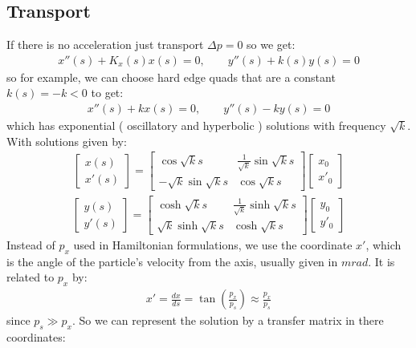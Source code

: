 \documentclass{article}
\numberwithin{equation}{section}
\begin{document}
\subsection{ Transport }
If there is no acceleration just transport $\Delta p = 0$ so we get:
\begin{align}
x''(s) + K_x(s) x(s) = 0 , \qquad
y''(s) + k(s) y(s) = 0
\end{align}
so for example, we can choose hard edge quads that are a constant $k(s) = -k < 0$ to get: 
\begin{align}
x''(s) + k x(s) = 0 , \qquad
y''(s) - k y(s) = 0
\end{align}
which has exponential ( oscillatory and hyperbolic ) solutions with frequency $\sqrt{k}$. With solutions given by:
\begin{align}
\begin{bmatrix} x(s) \\ x'(s) \end{bmatrix} =
\begin{bmatrix} \cos \sqrt{k}s & \frac{1}{\sqrt{k}} \sin \sqrt{k}s \\
-\sqrt{k} \sin \sqrt{k}s & \cos \sqrt{k}s \end{bmatrix}
\begin{bmatrix} x_0 \\ x'_0 \end{bmatrix}
\end{align}
\begin{align}
\begin{bmatrix} y(s) \\ y'(s) \end{bmatrix} =
\begin{bmatrix} \cosh \sqrt{k}s & \frac{1}{\sqrt{k}} \sinh \sqrt{k}s \\
\sqrt{k} \sinh \sqrt{k}s & \cosh \sqrt{k}s \end{bmatrix}
\begin{bmatrix} y_0 \\ y'_0 \end{bmatrix}
\end{align}
Instead of $p_x$ used in Hamiltonian formulations, we use the coordinate $x'$, which is the angle of the particle's velocity from the axis, usually given in $\si{mrad}$. It is related to $p_x$ by:
\begin{align}
x' = \frac{dx}{ds} = \tan \left( \frac{p_x}{p_s} \right) \approx \frac{p_x}{p_s}
\end{align}
since $p_s \gg p_x$. So we can represent the solution by a transfer matrix in there coordinates:
\end{document}
